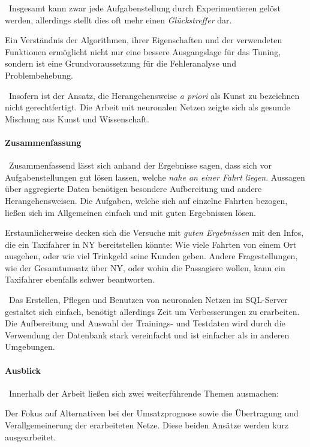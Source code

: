~\newline Insgesamt kann zwar jede Aufgabenstellung durch Experimentieren gelöst werden, allerdings stellt dies oft mehr einen \textit{Glückstreffer} dar. 

Ein Verständnis der Algorithmen, ihrer Eigenschaften und der verwendeten Funktionen ermöglicht nicht nur eine bessere Ausgangslage für das Tuning, sondern ist eine Grundvoraussetzung für die Fehleranalyse und Problembehebung. 

~\newline Insofern ist der Ansatz, die Herangehensweise \textit{a priori} als Kunst zu bezeichnen nicht gerechtfertigt. Die Arbeit mit neuronalen Netzen zeigte sich als gesunde Mischung aus Kunst und Wissenschaft. 

\paragraph{Zusammenfassung} ~\newline Zusammenfassend lässt sich anhand der Ergebnisse sagen, dass sich vor Aufgabenstellungen gut lösen lassen, welche \textit{nahe an einer Fahrt liegen}. Aussagen über aggregierte Daten benötigen besondere Aufbereitung und andere Herangehensweisen. Die Aufgaben, welche sich auf einzelne Fahrten bezogen, ließen sich im Allgemeinen einfach und mit guten Ergebnissen lösen.

Erstaunlicherweise decken sich die Versuche mit \textit{guten Ergebnissen} mit den Infos, die ein Taxifahrer in NY bereitstellen könnte: Wie viele Fahrten von einem Ort ausgehen, oder wie viel Trinkgeld seine Kunden geben. Andere Fragestellungen, wie der Gesamtumsatz über NY, oder wohin die Passagiere wollen, kann ein Taxifahrer ebenfalls schwer beantworten. 

~\newline Das Erstellen, Pflegen und Benutzen von neuronalen Netzen im SQL-Server gestaltet sich einfach, benötigt allerdings Zeit um Verbesserungen zu erarbeiten. Die Aufbereitung und Auswahl der Trainings- und Testdaten wird durch die Verwendung der Datenbank stark vereinfacht und ist einfacher als in anderen Umgebungen.
\newpage
\paragraph{Ausblick}~\newline Innerhalb der Arbeit ließen sich zwei weiterführende Themen ausmachen: 

Der Fokus auf Alternativen bei der Umsatzprognose sowie die Übertragung und Verallgemeinerung der erarbeiteten Netze. Diese beiden Ansätze werden kurz ausgearbeitet. 

